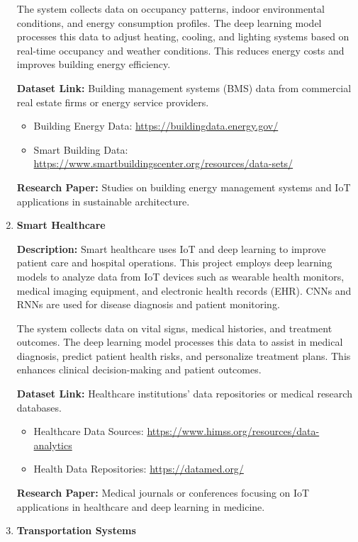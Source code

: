 \documentclass{article}
\begin{document}
\begin{enumerate}[label=\textbf{\arabic*.}, leftmargin=*]
The system collects data on occupancy patterns, indoor environmental conditions, and energy consumption profiles. The deep learning model processes this data to adjust heating, cooling, and lighting systems based on real-time occupancy and weather conditions. This reduces energy costs and improves building energy efficiency.

\textbf{Dataset Link:} Building management systems (BMS) data from commercial real estate firms or energy service providers.
\begin{itemize}
    \item Building Energy Data: \url{https://buildingdata.energy.gov/}
    \item Smart Building Data: \url{https://www.smartbuildingscenter.org/resources/data-sets/}
\end{itemize}

\textbf{Research Paper:} Studies on building energy management systems and IoT applications in sustainable architecture.

\item \textbf{Smart Healthcare}

\textbf{Description:}
Smart healthcare uses IoT and deep learning to improve patient care and hospital operations. This project employs deep learning models to analyze data from IoT devices such as wearable health monitors, medical imaging equipment, and electronic health records (EHR). CNNs and RNNs are used for disease diagnosis and patient monitoring.

The system collects data on vital signs, medical histories, and treatment outcomes. The deep learning model processes this data to assist in medical diagnosis, predict patient health risks, and personalize treatment plans. This enhances clinical decision-making and patient outcomes.

\textbf{Dataset Link:} Healthcare institutions' data repositories or medical research databases.
\begin{itemize}
    \item Healthcare Data Sources: \url{https://www.himss.org/resources/data-analytics}
    \item Health Data Repositories: \url{https://datamed.org/}
\end{itemize}

\textbf{Research Paper:} Medical journals or conferences focusing on IoT applications in healthcare and deep learning in medicine.

\item \textbf{Transportation Systems}


\end{enumerate}
\end{document}
